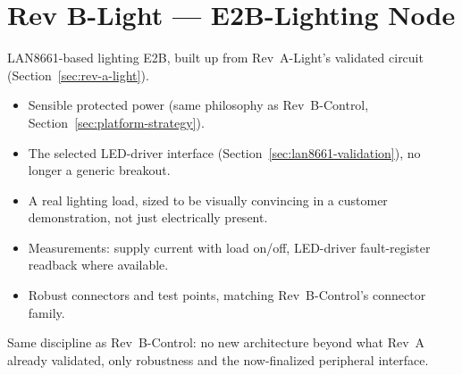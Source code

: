\section{Rev B-Light --- E2B-Lighting Node}
\label{sec:rev-b-light}

LAN8661-based lighting E2B, built up from Rev~A-Light's validated circuit (Section~\ref{sec:rev-a-light}).

\begin{itemize}[itemsep=0.1em]
\item Sensible protected power (same philosophy as Rev~B-Control, Section~\ref{sec:platform-strategy}).
\item The selected LED-driver interface (Section~\ref{sec:lan8661-validation}), no longer a generic breakout.
\item A real lighting load, sized to be visually convincing in a customer demonstration, not just electrically present.
\item Measurements: supply current with load on/off, LED-driver fault-register readback where available.
\item Robust connectors and test points, matching Rev~B-Control's connector family.
\end{itemize}

Same discipline as Rev~B-Control: no new architecture beyond what Rev~A already validated, only robustness and the now-finalized peripheral interface.
